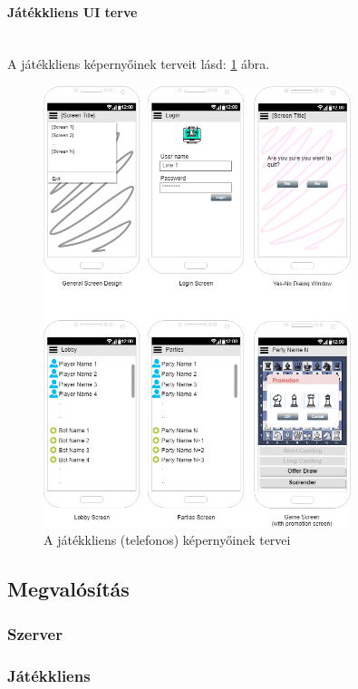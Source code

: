 \documentclass[twoside, a4paper, 12pt]{article}
\begin{document}
\paragraph{Játékkliens UI terve} \mbox{} \\
A játékkliens képernyőinek terveit lásd: \ref{fig:gameClientScreens} ábra.
\begin{figure}[htbp]
	\centering
	\includegraphics[width=0.8\textwidth]{img/gameClientScreens.png}
	\caption{A játékkliens (telefonos) képernyőinek tervei}
	\label{fig:gameClientScreens}
\end{figure}







\subsection{Megvalósítás}
\subsubsection{Szerver}
\lipsum[1]

\subsubsection{Játékkliens}
\lipsum[2]
\end{document}

